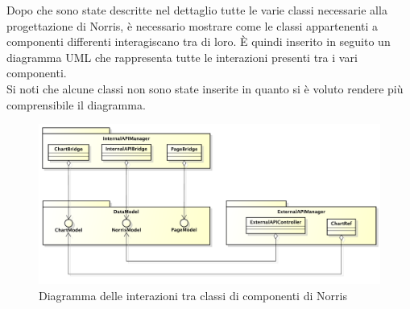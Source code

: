 	Dopo che sono state descritte nel dettaglio tutte le varie classi necessarie alla progettazione di Norris, è necessario mostrare come le classi appartenenti a componenti differenti interagiscano tra di loro. È quindi inserito in seguito un diagramma UML che rappresenta tutte le interazioni presenti tra i vari componenti.\\
	Si noti che alcune classi non sono state inserite in quanto si è voluto rendere più comprensibile il diagramma.
	\begin{figure}[H]\centering
		\includegraphics[width=\textwidth]{SpecificaTecnica/Pics/InterazioniComponentiNorris.pdf}
		\caption{Diagramma delle interazioni tra classi di componenti di Norris}
	\end{figure}
